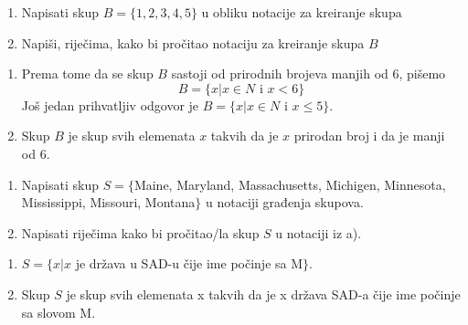 \documentclass[a4paper,14pt,svgnames]{article}
\newcounter{counter}
\newcommand{\examplecounter}{\textbf{\refstepcounter{counter}PRIMJER \thecounter}}
\begin{document}
\begin{tcolorbox}[title=\large \examplecounter \hfill\small\textbf{"Korištenje notacije za kreiranje skupova"}]
\begin{enumerate}[label=\alph*),leftmargin=0.5cm]
\item Napisati skup $B=\{1, 2, 3, 4, 5\}$ u obliku notacije za kreiranje skupa
\item Napiši, riječima, kako bi pročitao notaciju za kreiranje skupa $B$
\end{enumerate}
\begin{tcolorbox}[title=\small \textbf{RJEŠENJE},colback=white]
\begin{center}
\begin{enumerate}[label=\alph*),leftmargin=0.5cm]
\item Prema tome da se skup $B$ sastoji od prirodnih brojeva manjih od 6, pišemo $$B=\{x|x\in N\text { i } x< 6\}$$ Još jedan prihvatljiv odgovor je $B=\{x|x\in N$ i $x\leqslant 5\}$.
\item Skup $B$ je skup svih elemenata $x$ takvih da je $x$ prirodan broj i da je manji od 6.
\end{enumerate}
\end{center}
\end{tcolorbox}
\end{tcolorbox}

\begin{tcolorbox}[title=\large \examplecounter \hfill\small\textbf{"Forma popisa u notaciji građenja skupova"}]
\begin{enumerate}[label=\alph*),leftmargin=0.5cm]
\item Napisati skup $S = \{$Maine, Maryland, Massachusetts, Michigen, Minnesota, Mississippi, Missouri, Montana$\}$ u notaciji građenja skupova.
\item Napisati riječima kako bi pročitao/la skup $S$ u notaciji iz a).
\end{enumerate}
\begin{tcolorbox}[title=\small \textbf{RJEŠENJE},colback=white]
\begin{center}
\begin{enumerate}[label=\alph*),leftmargin=0.5cm]
\item $S=\{x|x$ je država u SAD-u čije ime počinje sa M$\}$.
\item Skup $S$ je skup svih elemenata x takvih da je x država SAD-a čije ime počinje sa slovom M.
\end{enumerate}
\end{center}
\end{tcolorbox}
\end{tcolorbox}
\end{document}
